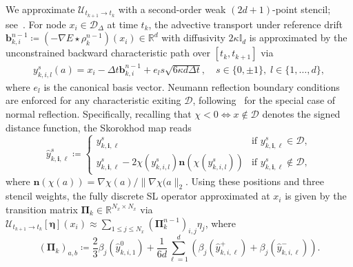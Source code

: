 \documentclass[10pt,a4paper]{article}
\begin{document}
We approximate $\mathcal{U}_{t_{k+1}\to t_k}$ with a second-order weak $(2d+1)$-point stencil; see~\cite{CalzolaCarliniDupuisSilva2023}. For node $x_i \in \mathcal{D}_\Delta$ at time $t_k$, the advective transport under reference drift $\mathbf{b}_{k,i}^{n-1} \coloneq (-\nabla E \star \rho_k^{n-1})(x_i) \in \mathbb{R}^d$ with diffusivity $2\kappa \mathbb{I}_d$ is approximated by the unconstrained backward characteristic path over $[t_k, t_{k+1}]$ via
\begin{equation}
\begin{aligned}
y_{k,i,l}^s(a) = x_i - \Delta t \mathbf{b}_{k,i}^{n-1} + e_l s \sqrt{6\kappa d \Delta t}, \quad s \in \{0, \pm 1\}, \; l \in \{1, \dots, d\},
\end{aligned}
\end{equation}%
where $e_l$ is the canonical basis vector. Neumann reflection boundary conditions are enforced for any characteristic exiting $\mathcal{D}$, following~\cite{CalzolaCarliniDupuisSilva2023} for the special case of normal reflection. Specifically, recalling that $\chi < 0 \Longleftrightarrow x \notin \mathcal{D}$ denotes the signed distance function, the Skorokhod map reads
\begin{equation}
\hat{y}_{k,\mathbf{i},\ell}^s \coloneq \begin{cases}
y_{k,\mathbf{i},\ell}^s & \text{if } y_{k,\mathbf{i},\ell}^s \in \mathcal{D}, \\
y_{k,\mathbf{i},\ell}^s - 2\chi(y_{k,i,l}^s) \mathbf{n}(\chi(y_{k,i,l}^s)) & \text{if } y_{k,\mathbf{i},\ell}^s \notin \mathcal{D},
\end{cases}
\end{equation}%
where $\mathbf{n}(\chi(a)) = \nabla\chi(a)/\|\nabla\chi(a\|_2$. Using these positions and three stencil weights, the fully discrete SL operator approximated at $x_i$ is given by the transition matrix $\mathbf{\Pi}_k \in \mathbb{R}^{N_x \times N_x}$ via $\mathcal{U}_{t_{k+1}\to t_k}[\boldsymbol{\eta}](x_i) \approx \sum_{1 \leqslant j \leqslant N_x} (\mathbf{\Pi}_k^{n-1})_{i,j} \eta_j$, where
\begin{equation}
(\mathbf{\Pi}_k)_{a,b} \coloneq \frac{2}{3} \beta_j(\hat{y}_{k,i,1}^0) + \frac{1}{6d} \sum_{\ell = 1}^d \left( \beta_j(\hat{y}_{k,i,\ell}^+) + \beta_j(\hat{y}_{k,i,\ell}^-) \right).
\end{equation}%
\end{document}
